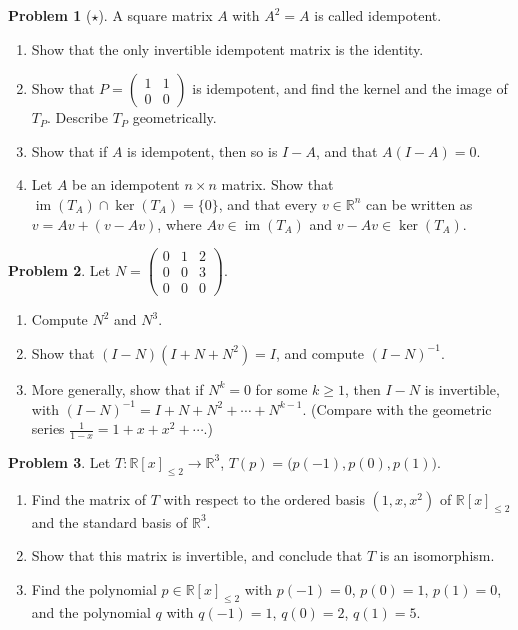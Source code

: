 \documentclass[11pt]{article}
\theoremstyle{definition}
\newtheorem{problem}{Problem}[section]
\DeclareMathOperator{\im}{im}
\begin{document}
\begin{problem}[$\star$]\label{pr:idempotent}
    A square matrix $A$ with $A^2 = A$ is called idempotent.
    \begin{enumerate}[label=(\alph*)]
        \item Show that the only invertible idempotent matrix is the identity.
        \item Show that $P = \begin{pmatrix} 1 & 1 \\ 0 & 0 \end{pmatrix}$ is idempotent, and find the kernel and the image of $T_P$. Describe $T_P$ geometrically.
        \item Show that if $A$ is idempotent, then so is $I - A$, and that $A(I - A) = 0$.
        \item Let $A$ be an idempotent $n \times n$ matrix. Show that $\im(T_A) \cap \ker(T_A) = \{0\}$, and that every $v \in \mathbb{R}^n$ can be written as $v = Av + (v - Av)$, where $Av \in \im(T_A)$ and $v - Av \in \ker(T_A)$.
    \end{enumerate}
\end{problem}

\begin{problem}\label{pr:nilpotent}
    Let $N = \begin{pmatrix} 0 & 1 & 2 \\ 0 & 0 & 3 \\ 0 & 0 & 0 \end{pmatrix}$.
    \begin{enumerate}[label=(\alph*)]
        \item Compute $N^2$ and $N^3$.
        \item Show that $(I - N)(I + N + N^2) = I$, and compute $(I - N)^{-1}$.
        \item More generally, show that if $N^k = 0$ for some $k \geq 1$, then $I - N$ is invertible, with $(I - N)^{-1} = I + N + N^2 + \cdots + N^{k-1}$. (Compare with the geometric series $\frac{1}{1 - x} = 1 + x + x^2 + \cdots$.)
    \end{enumerate}
\end{problem}

\begin{problem}\label{pr:interpolation}
    Let $T: \mathbb{R}[x]_{\leq 2} \to \mathbb{R}^3$, $T(p) = \big(p(-1), p(0), p(1)\big)$.
    \begin{enumerate}[label=(\alph*)]
        \item Find the matrix of $T$ with respect to the ordered basis $(1, x, x^2)$ of $\mathbb{R}[x]_{\leq 2}$ and the standard basis of $\mathbb{R}^3$.
        \item Show that this matrix is invertible, and conclude that $T$ is an isomorphism.
        \item Find the polynomial $p \in \mathbb{R}[x]_{\leq 2}$ with $p(-1) = 0$, $p(0) = 1$, $p(1) = 0$, and the polynomial $q$ with $q(-1) = 1$, $q(0) = 2$, $q(1) = 5$.
    \end{enumerate}
\end{problem}
\end{document}
